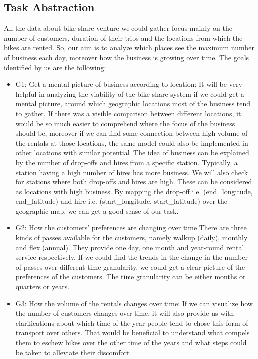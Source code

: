 \subsection{Task Abstraction}
\label{sec:task}
All the data about bike share venture we could gather focus mainly on the number of customers, duration of their trips and the locations from which the bikes are rented. So, our aim is to analyze which places see the maximum number of business each day, moreover how the business is growing over time. The goals identified by us are the following:

\begin{itemize}
    \item G1: Get a mental picture of business according to location:
    It will be very helpful in analyzing the viability of the bike share system if we could get a mental picture, around which geographic locations most of the business tend to gather. If there was a visible comparison between different locations, it would be so much easier to comprehend where the focus of the business should be, moreover if we can find some connection between high volume of the rentals at those locations, the same model could also be implemented in other locations with similar potential. The idea of business can be explained by the number of drop-offs and hires from a specific station. Typically, a station having a high number of hires has more business. We will also check for stations where both drop-offs and hires are high. These can be considered as locations with high business. By mapping the drop-off i.e. (end\_longitude, end\_latitude) and hire i.e. (start\_longitude, start\_latitude) over the geographic map, we can get a good sense of our task.

    \item G2:  How the customers’ preferences are changing over time
    There are three kinds of passes available for the customers, namely walkup (daily), monthly and flex (annual). They provide one day, one month and year-round rental service respectively. If we could find the trends in the change in the number of passes over different time granularity, we could get a clear picture of the preferences of the customers. The time granularity can be either months or quarters or years.
    
    \item G3: How the volume of the rentals changes over time:
    If we can visualize how the number of customers changes over time, it will also provide us with clarifications about which time of the year people tend to chose this form of transport over others. That would be beneficial to understand what compels them to eschew bikes over the other time of the years and what steps could be taken to alleviate their discomfort.
 
\end{itemize}

